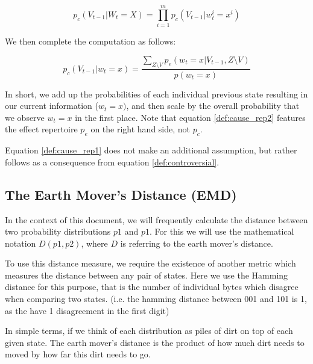 \begin{equation}
\label{def:cause_rep1}
p_c(V_{t-1} | W_t=X) = \prod \limits_{i = 1}^{m} p_c(V_{t-1}|w^i_{t} = x^i)
\end{equation}

We then complete the computation as follows:

\begin{equation}
\label{def:cause_rep2}
p_c(V_{t-1}| w_t = x) = \frac{\sum \limits_{Z\setminus V} p_e(w_t = x| V_{t-1}, Z \setminus V)}{p(w_t = x)}
\end{equation}

In short, we add up the probabilities of each individual previous state resulting in our current information ($w_t = x)$, and then scale by the overall probability that we observe $w_t = x$ in the first place. Note that equation \ref{def:cause_rep2} features the effect repertoire $p_e$ on the right hand side, not $p_c$.

\begin{remark}
	Equation \ref{def:cause_rep1} does not make an additional assumption, but rather follows as a consequence from equation \ref{def:controversial}.
\end{remark}



\subsection{The Earth Mover's Distance (EMD)}
In the context of this document, we will frequently calculate the distance between two probability distributions $p1$ and $p1$. For this we will use the mathematical notation $D(p1,p2)$, where $D$ is referring to the earth mover's distance.

To use this distance measure, we require the existence of another metric which measures the distance between any pair of states. Here we use the Hamming distance for this purpose, that is the number of individual bytes which disagree when comparing two states. (i.e. the hamming distance between 001 and 101 is 1, as the have 1 disagreement in the first digit)

In simple terms, if we think of each distribution as piles of dirt on top of each given state. The earth mover's distance is the product of how much dirt needs to moved by how far this dirt needs to go. 

